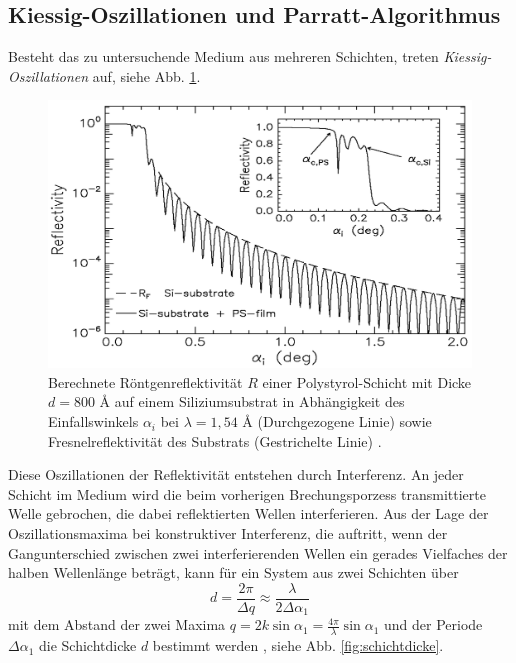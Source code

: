 \subsection*{Kiessig-Oszillationen und Parratt-Algorithmus}
Besteht das zu untersuchende Medium aus mehreren Schichten, treten \textit{Kiessig-Oszillationen} auf, siehe Abb. \ref{fig:kiessig}. 
\begin{figure}
    \centering
    \includegraphics[width = \linewidth]{kiessig.png}
    \caption{Berechnete Röntgenreflektivität $R$ einer Polystyrol-Schicht mit Dicke $d = 800$ Å auf einem Siliziumsubstrat in 
    Abhängigkeit des Einfallswinkels $\alpha_i$ bei $\lambda = 1,54$ Å (Durchgezogene Linie) sowie 
    Fresnelreflektivität des Substrats (Gestrichelte Linie) \cite{kiessig}.}
    \label{fig:kiessig}
\end{figure}
Diese Oszillationen der Reflektivität entstehen durch Interferenz. An jeder Schicht im Medium wird die 
beim vorherigen Brechungsporzess transmittierte Welle gebrochen, die dabei reflektierten Wellen 
interferieren. Aus der Lage der Oszillationsmaxima bei konstruktiver Interferenz, die auftritt, wenn der 
Gangunterschied zwischen zwei interferierenden Wellen
ein gerades Vielfaches der halben Wellenlänge beträgt, kann für ein System aus zwei Schichten über
\begin{equation*}
    d = \frac{2 \pi}{\Delta q} \approx \frac{\lambda}{2 \Delta \alpha_1}
\end{equation*} 
mit dem Abstand der zwei Maxima $q = 2 k \sin \alpha_1 = \frac{4 \pi}{\lambda} \sin \alpha_1$
und der Periode $\Delta \alpha_1$ die Schichtdicke $d$ bestimmt werden \cite{dissertation}, siehe Abb. \ref{fig:schichtdicke}.
